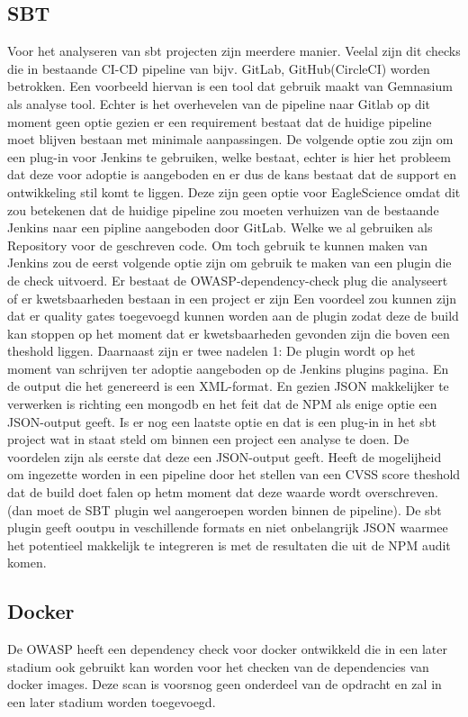 \subsection{SBT}\label{subsec:sbt}
Voor het analyseren van sbt projecten zijn meerdere manier. Veelal zijn dit checks die in bestaande CI-CD pipeline van bijv. GitLab, GitHub(CircleCI) worden betrokken. Een voorbeeld hiervan is een tool dat gebruik maakt van Gemnasium als analyse tool. Echter is het overhevelen van de pipeline naar Gitlab op dit moment geen optie gezien er een requirement bestaat dat de huidige pipeline moet blijven bestaan met minimale aanpassingen. De volgende optie zou zijn om een plug-in voor Jenkins te gebruiken, welke bestaat, echter is hier het probleem dat deze voor adoptie is aangeboden en er dus de kans bestaat dat de support en ontwikkeling stil komt te liggen. Deze zijn geen optie voor EagleScience omdat dit zou betekenen dat de huidige pipeline zou moeten verhuizen van de bestaande Jenkins naar een pipline aangeboden door GitLab. Welke we al gebruiken als Repository voor de geschreven code. Om toch gebruik te kunnen maken van Jenkins zou de eerst volgende optie zijn om gebruik te maken van een plugin die de check uitvoerd. Er bestaat de OWASP-dependency-check plug die analyseert of er kwetsbaarheden bestaan in een project er zijn Een voordeel zou kunnen zijn dat er quality gates toegevoegd kunnen worden aan de plugin zodat deze de build kan stoppen op het moment dat er kwetsbaarheden gevonden zijn die boven een theshold liggen. Daarnaast zijn er twee nadelen 1: De plugin wordt op het moment van schrijven ter adoptie aangeboden op de Jenkins plugins pagina. En de output die het genereerd is een XML-format. En gezien JSON makkelijker te verwerken is richting een mongodb en het feit dat de NPM als enige optie een JSON-output geeft. Is er nog een laatste optie en dat is een plug-in in het sbt project wat in staat steld om binnen een project een analyse te doen. De voordelen zijn als eerste dat deze een JSON-output geeft. Heeft de mogelijheid om ingezette worden in een pipeline door het stellen van een CVSS score theshold dat de build doet falen op hetm moment dat deze waarde wordt overschreven. (dan moet de SBT plugin wel aangeroepen worden binnen de pipeline). De sbt plugin geeft ooutpu in veschillende formats en niet onbelangrijk JSON waarmee het potentieel makkelijk te integreren is met de resultaten die uit de NPM audit komen.

\subsection{Docker}\label{subsec:docker}
De OWASP heeft een dependency check voor docker ontwikkeld die in een later stadium ook gebruikt kan worden voor het checken van de dependencies van docker images. Deze scan is voorsnog geen onderdeel van de opdracht en zal in een later stadium worden toegevoegd.



